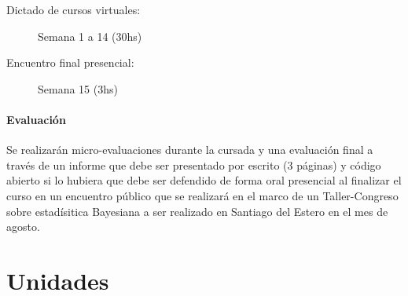 \documentclass[10pt]{article}
\begin{document}
\begin{description}
\item[Dictado de cursos virtuales:] Semana 1 a 14 (30hs)
\item[Encuentro final presencial:] Semana 15 (3hs)
\end{description}

\paragraph{Evaluación} Se realizarán micro-evaluaciones durante la cursada y una evaluación final a través de un informe que debe ser presentado por escrito (3 páginas) y código abierto si lo hubiera que debe ser defendido de forma oral presencial al finalizar el curso en un encuentro público que se realizará en el marco de un Taller-Congreso sobre estadísitica Bayesiana a ser realizado en Santiago del Estero en el mes de agosto. 

\section{Unidades}
\end{document}
